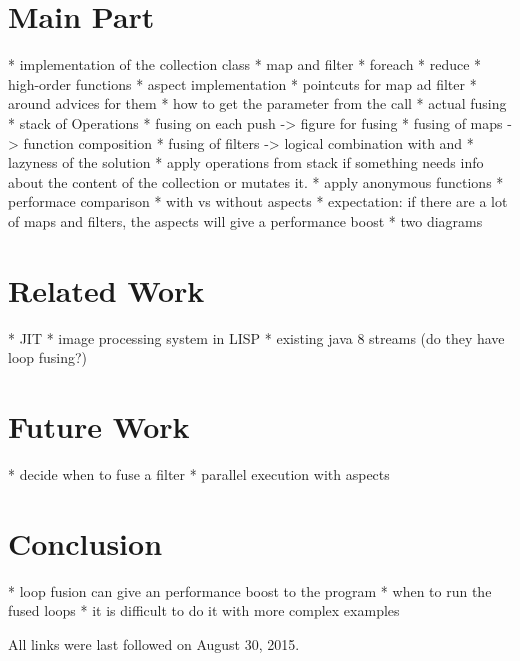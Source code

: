 \documentclass[runningheads,a4paper]{llncs}
\begin{document}
\section{Main Part}\label{sec:intro}
* implementation of the collection class
  * map and filter
  * foreach
  * reduce
  * high-order functions
* aspect implementation
  * pointcuts for map ad filter
  * around advices for them
    * how to get the parameter from the call
  * actual fusing
    * stack of Operations
    * fusing on each push
      -> figure for fusing
    * fusing of maps -> function composition
    * fusing of filters -> logical combination with and
  * lazyness of the solution
    * apply operations from stack if something needs info about the content of the collection or mutates it.
    * apply anonymous functions
* performace comparison
  * with vs without aspects
  * expectation: if there are a lot of maps and filters, the aspects will give a performance boost
  * two diagrams

\section{Related Work}\label{sec:intro}
* JIT
* image processing system in LISP
* existing java 8 streams (do they have loop fusing?)
\section{Future Work}\label{sec:intro}
* decide when to fuse a filter
* parallel execution with aspects
\section{Conclusion}\label{sec:intro}
* loop fusion can give an performance boost to the program
* when to run the fused loops
* it is difficult to do it with more complex examples




All links were last followed on August 30, 2015.
\end{document}
